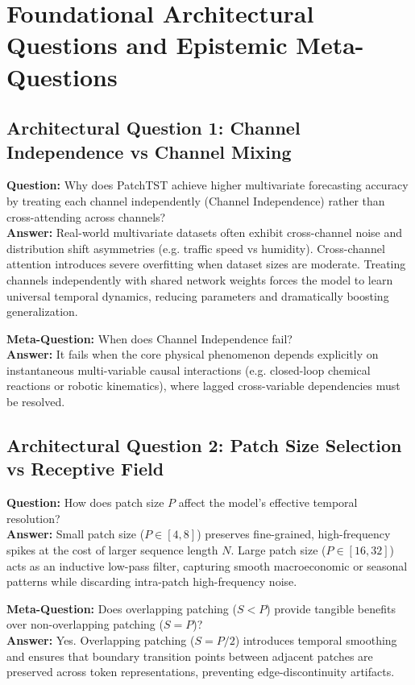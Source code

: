 \documentclass[11pt,a4paper]{article}
\theoremstyle{definition}
\begin{document}
\section{Foundational Architectural Questions and Epistemic Meta-Questions}

\subsection{Architectural Question 1: Channel Independence vs Channel Mixing}
\textbf{Question:} Why does PatchTST achieve higher multivariate forecasting accuracy by treating each channel independently (Channel Independence) rather than cross-attending across channels?\\
\textbf{Answer:} Real-world multivariate datasets often exhibit cross-channel noise and distribution shift asymmetries (e.g. traffic speed vs humidity). Cross-channel attention introduces severe overfitting when dataset sizes are moderate. Treating channels independently with shared network weights forces the model to learn universal temporal dynamics, reducing parameters and dramatically boosting generalization.

\textbf{Meta-Question:} When does Channel Independence fail?\\
\textbf{Answer:} It fails when the core physical phenomenon depends explicitly on instantaneous multi-variable causal interactions (e.g. closed-loop chemical reactions or robotic kinematics), where lagged cross-variable dependencies must be resolved.

\subsection{Architectural Question 2: Patch Size Selection vs Receptive Field}
\textbf{Question:} How does patch size $P$ affect the model's effective temporal resolution?\\
\textbf{Answer:} Small patch size ($P \in [4, 8]$) preserves fine-grained, high-frequency spikes at the cost of larger sequence length $N$. Large patch size ($P \in [16, 32]$) acts as an inductive low-pass filter, capturing smooth macroeconomic or seasonal patterns while discarding intra-patch high-frequency noise.

\textbf{Meta-Question:} Does overlapping patching ($S < P$) provide tangible benefits over non-overlapping patching ($S = P$)?\\
\textbf{Answer:} Yes. Overlapping patching ($S = P/2$) introduces temporal smoothing and ensures that boundary transition points between adjacent patches are preserved across token representations, preventing edge-discontinuity artifacts.
\end{document}
